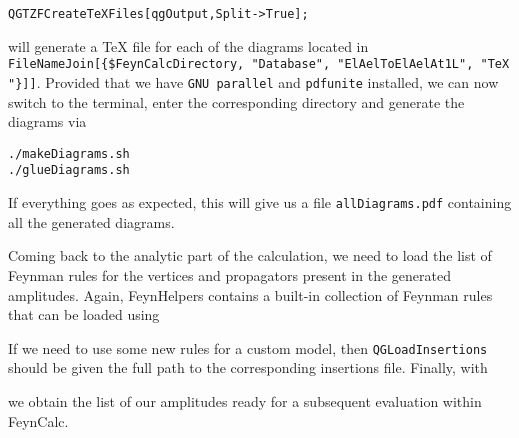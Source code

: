 \documentclass[../FeynHelpersManual.tex]{subfiles}
\begin{document}
\begin{verbatim}
QGTZFCreateTeXFiles[qgOutput,Split->True];
\end{verbatim}

will generate a TeX file for each of the diagrams located in
\texttt{FileNameJoin[\allowbreak{}\{\allowbreak{}\$FeynCalcDirectory,\ \allowbreak{}"Database",\ \allowbreak{}"ElAelToElAelAt1L",\ \allowbreak{}"TeX"\}]]}.
Provided that we have \texttt{GNU parallel} and \texttt{pdfunite}
installed, we can now switch to the terminal, enter the corresponding
directory and generate the diagrams via

\begin{verbatim}
./makeDiagrams.sh
./glueDiagrams.sh
\end{verbatim}

If everything goes as expected, this will give us a file
\texttt{allDiagrams.pdf} containing all the generated diagrams.

Coming back to the analytic part of the calculation, we need to load the
list of Feynman rules for the vertices and propagators present in the
generated amplitudes. Again, FeynHelpers contains a built-in collection
of Feynman rules that can be loaded using

\begin{Shaded}
\begin{Highlighting}[]
\OperatorTok{[}\OperatorTok{]}\NormalTok{;}
\end{Highlighting}
\end{Shaded}

If we need to use some new rules for a custom model, then
\texttt{QGLoadInsertions} should be given the full path to the
corresponding insertions file. Finally, with

\begin{Shaded}
\begin{Highlighting}[]
\ExtensionTok{=}\OperatorTok{[}\OperatorTok{,}\OtherTok{{-}\textgreater{}}\OperatorTok{]}\NormalTok{;}
\end{Highlighting}
\end{Shaded}

we obtain the list of our amplitudes ready for a subsequent evaluation
within FeynCalc.
\end{document}

